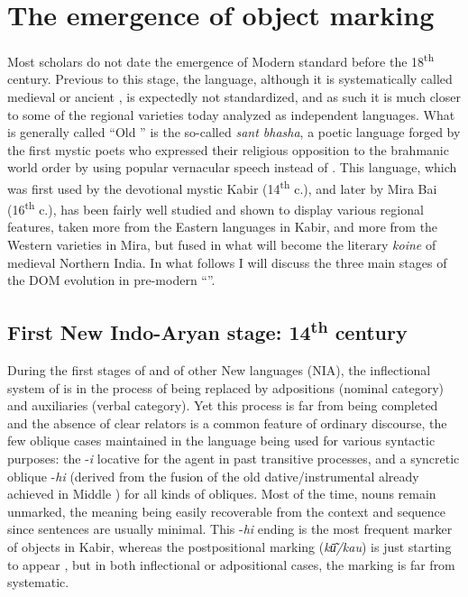 \documentclass[output=paper]{LSP/langsci}
\begin{document}
\section{The emergence of object marking}
\label{10-mo-sec:4}
Most scholars do not date the emergence of Modern standard  before the 18\textsuperscript{th} century. Previous to this stage, the language, although it is systematically called medieval or ancient , is expectedly not standardized, and as such it is much closer to some of the regional varieties today analyzed as independent languages. What is generally called “Old ” is the so-called \textit{sant bhasha}, a poetic language forged by the first mystic poets who expressed their religious opposition to the brahmanic world order by using popular vernacular speech instead of . This language, which was first used by the devotional mystic Kabir (14\textsuperscript{th} c.), and later by Mira Bai (16\textsuperscript{th} c.), has been fairly well studied and shown to display various regional features, taken more from the Eastern languages in Kabir, and more from the Western varieties in Mira, but fused in what will become the literary \textit{koine} of medieval Northern India. In what follows I will discuss the three main stages of the DOM evolution in pre-modern “”.


\subsection{First New Indo-Aryan stage: 14\textsuperscript{th} century} \label{10-mo-sec:4.1}

During the first stages of  and of other New  languages (NIA), the inflectional system of  is in the process of being replaced by adpositions (nominal category) and auxiliaries (verbal category). Yet this process is far from being completed and the absence of clear relators is a common feature of ordinary discourse, the few oblique cases maintained in the language being used for various syntactic purposes: the -\textit{i} locative for the agent in past transitive processes, and a syncretic oblique -\textit{hi} (derived from the fusion of the old dative/instrumental already achieved in Middle ) for all kinds of obliques. Most of the time, nouns remain unmarked, the meaning being easily recoverable from the context and sequence since sentences are usually minimal. This -\textit{hi} ending is the most frequent marker of objects in Kabir, whereas the postpositional marking (\textit{kū͂/kau}) is just starting to appear \citep[325]{Strnad2013Morphology}, but in both inflectional or adpositional cases, the marking is far from systematic. 
\end{document}
